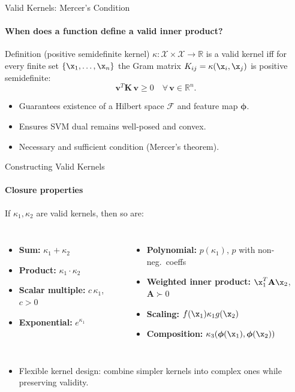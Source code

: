 \begin{frame}{Valid Kernels: Mercer's Condition}
  \framesubtitle{When does a function define a valid inner product?}
  \begin{block}{Definition (positive semidefinite kernel)}
    $\kappa: \mathcal{X}\times\mathcal{X}\to\mathbb{R}$ is a valid kernel iff for every
    finite set $\{\x_1,\ldots,\x_n\}$ the \alert{Gram matrix}
    $K_{ij} = \kappa(\x_i,\x_j)$ is positive semidefinite:
    \[
      \mathbf{v}^T \mathbf{K}\,\mathbf{v} \ge 0 \quad\forall\,\mathbf{v}\in\mathbb{R}^n.
    \]
  \end{block}
  \begin{itemize}
    \item Guarantees existence of a Hilbert space $\mathcal{F}$ and feature map $\boldsymbol{\phi}$.
    \item Ensures SVM dual remains \alert{well-posed and convex}.
    \item Necessary and sufficient condition (Mercer's theorem).
  \end{itemize}
\end{frame}

\begin{frame}{Constructing Valid Kernels}
  \framesubtitle{Closure properties}
  If $\kappa_1, \kappa_2$ are valid kernels, then so are:
  \vspace{0.3em}
  \begin{columns}
      \begin{itemize}
        \item \textbf{Sum:} $\kappa_1 + \kappa_2$
        \item \textbf{Product:} $\kappa_1 \cdot \kappa_2$
        \item \textbf{Scalar multiple:} $c\,\kappa_1$, $c>0$
        \item \textbf{Exponential:} $e^{\kappa_1}$
      \end{itemize}
      \begin{itemize}
        \item \textbf{Polynomial:} $p(\kappa_1)$, $p$ with non-neg.\ coeffs
        \item \textbf{Weighted inner product:} $\x_1^T\mathbf{A}\x_2$, $\mathbf{A}\succ 0$
        \item \textbf{Scaling:} $f(\x_1)\kappa_1 g(\x_2)$
        \item \textbf{Composition:} $\kappa_3(\boldsymbol{\phi}(\x_1),\boldsymbol{\phi}(\x_2))$
      \end{itemize}
  \end{columns}
  \vspace{0.4em}
  \begin{itemize}
    \item \alert{Flexible kernel design}: combine simpler kernels into complex ones while
          preserving validity.
  \end{itemize}
\end{frame}

